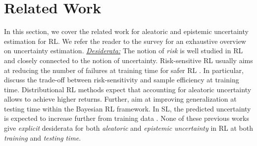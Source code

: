 \vspace{-3mm}
\section{Related Work}

In this section, we cover the related work for aleatoric and epistemic uncertainty estimation for RL. 
We refer the reader to the survey \cite{review-uncertainty-dl} for an exhaustive overview on uncertainty estimation. 
\underline{\textit{Desiderata:}} The notion of \emph{risk} is well studied in RL and closely connected to the notion of uncertainty. Risk-sensitive RL usually aims at reducing the number of failures at training time for safer RL \cite{risk-sensitive-rl, risk-constrained-rl-percentile, risk-sensitive-mdp, safe-rl-survey}. In particular, \cite{risk-uncertainty-deep-rl, rl-risk-sample-trade-off, epistemic-risk} discuss the trade-off between risk-sensitivity and sample efficiency at training time. Distributional RL methods expect that accounting for aleatoric uncertainty allows to achieve higher returns. Further, \cite{epistemic-pomdp} aim at improving generalization at testing time within the Bayesian RL framework. In SL, the predicted uncertainty is expected to increase further from training data \citep{provable-uncertainty, natpn, bayesian-a-bit, graph-postnet}. None of these previous works give \emph{explicit} desiderata for both \emph{aleatoric} and \emph{epistemic} \emph{uncertainty} in RL at both \emph{training} and \emph{testing} \emph{time}. 

